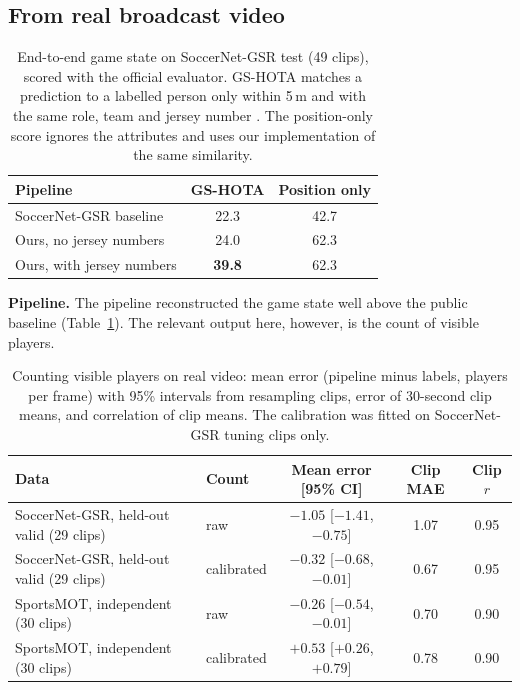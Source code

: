 \documentclass[11pt]{article}
\begin{document}
\subsection{From real broadcast video}

\begin{table}[t]
\centering
\caption{End-to-end game state on SoccerNet-GSR test (49 clips), scored with the official evaluator. GS-HOTA matches
a prediction to a labelled person only within 5\,m and with the same role, team and jersey number
\citep{luiten2021hota}. The position-only score ignores the attributes and uses our implementation of the same
similarity.}
\label{tab:gsr}
\begin{tabular}{lcc}
\toprule
Pipeline & GS-HOTA & Position only \\
\midrule
SoccerNet-GSR baseline \citep{somers2024gsr} & 22.3 & 42.7 \\
Ours, no jersey numbers & 24.0 & 62.3 \\
Ours, with jersey numbers & \textbf{39.8} & 62.3 \\
\bottomrule
\end{tabular}
\end{table}

\textbf{Pipeline.} The pipeline reconstructed the game state well above the public baseline (Table~\ref{tab:gsr}).
The relevant output here, however, is the count of visible players.

\begin{table}[t]
\centering
\caption{Counting visible players on real video: mean error (pipeline minus labels, players per frame) with 95\%
intervals from resampling clips, error of 30-second clip means, and correlation of clip means. The calibration was
fitted on SoccerNet-GSR tuning clips only.}
\label{tab:count}
\small
\begin{tabular}{llccc}
\toprule
Data & Count & Mean error [95\% CI] & Clip MAE & Clip $r$ \\
\midrule
SoccerNet-GSR, held-out valid (29 clips) & raw & $-1.05$ [$-1.41$, $-0.75$] & 1.07 & 0.95 \\
SoccerNet-GSR, held-out valid (29 clips) & calibrated & $-0.32$ [$-0.68$, $-0.01$] & 0.67 & 0.95 \\
SportsMOT, independent (30 clips) & raw & $-0.26$ [$-0.54$, $-0.01$] & 0.70 & 0.90 \\
SportsMOT, independent (30 clips) & calibrated & $+0.53$ [$+0.26$, $+0.79$] & 0.78 & 0.90 \\
\bottomrule
\end{tabular}
\end{table}
\end{document}

